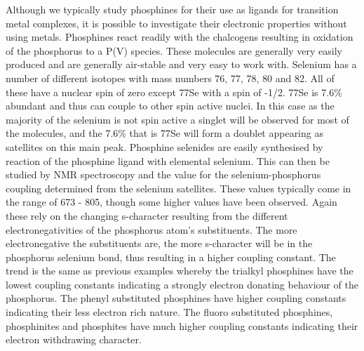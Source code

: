 Although we typically study phosphines for their use as ligands for transition metal complexes, it is possible to investigate their electronic properties without using metals.  Phosphines react readily with the chalcogens resulting in oxidation of the phosphorus to a P(V) species.  These molecules are generally very easily produced and are generally air-stable and very easy to work with.  Selenium has a number of different isotopes with mass numbers 76, 77, 78, 80 and 82.  All of these have a nuclear spin of zero except 77Se with a spin of -1/2.  77Se is 7.6\% abundant and thus can couple to other spin active nuclei.  In this case as the majority of the selenium is not spin active a singlet will be observed for most of the molecules, and the 7.6\% that is 77Se will form a doublet appearing as satellites on this main peak.  Phosphine selenides are easily synthesised by reaction of the phosphine ligand with elemental selenium.  This can then be studied by \phosphorus{} NMR spectroscopy and the value for the selenium-phosphorus coupling determined from the selenium satellites.   These values typically come in the range of 673 - 805, though some higher values have been observed.  Again these rely on the changing s-character resulting from the different electronegativities of the phosphorus atom's substituents.  The more electronegative the substituents are, the more s-character will be in the phosphorus selenium bond, thus resulting in a higher coupling constant.  The trend is the same as previous examples whereby the trialkyl phosphines have the lowest coupling constants indicating a strongly electron donating behaviour of the phosphorus.  The phenyl substituted phosphines have higher coupling constants indicating their less electron rich nature.  The fluoro substituted phosphines, phosphinites and phosphites  have much higher coupling constants indicating their electron withdrawing character.  

